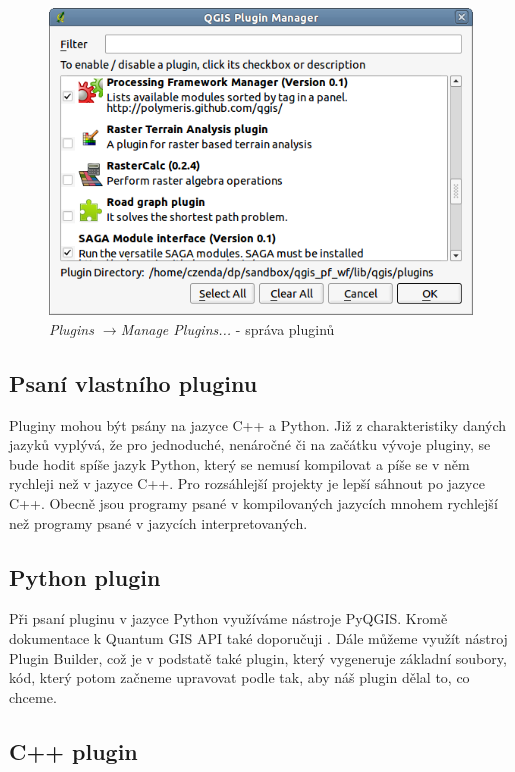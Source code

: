 \begin{figure}
	\centering
	\includegraphics[scale=0.5]{pictures/qgis_plugin/plugin_manager}
	\caption{\textit{Plugins $\rightarrow$Manage Plugins...} - správa pluginů}
  	\label{plugin_manager}
\end{figure}

\subsection{Psaní vlastního pluginu}
Pluginy mohou být psány na jazyce C++ a Python. Již z charakteristiky daných jazyků vyplývá, že pro jednoduché, nenáročné či na začátku vývoje pluginy, se bude hodit spíše jazyk Python, který se nemusí kompilovat a píše se v něm rychleji než v jazyce C++. Pro rozsáhlejší projekty je lepší sáhnout po jazyce C++. Obecně jsou programy psané v kompilovaných jazycích mnohem rychlejší než programy psané v jazycích interpretovaných. 

\subsection{Python plugin}
\nocite{pyqgis:www}
Při psaní pluginu v jazyce Python využíváme nástroje PyQGIS. Kromě dokumentace k Quantum GIS API také doporučuji \cite{pyqgis:www}. Dále můžeme využít nástroj Plugin Builder, což je v podstatě také plugin, který vygeneruje základní soubory, kód, který potom začneme upravovat podle tak, aby náš plugin dělal to, co chceme. \\



\subsection{C++ plugin}

